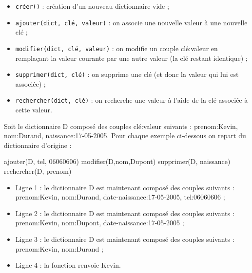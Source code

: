 \documentclass[
  a4paper,
  DIV=11,
  numbers=noendperiod]{scrartcl}
\newenvironment{Shaded}{\begin{snugshade}}{\end{snugshade}}
\newcommand{\DecValTok}[1]{\textcolor[rgb]{0.68,0.00,0.00}{#1}}
\newcommand{\ErrorTok}[1]{\textcolor[rgb]{0.68,0.00,0.00}{#1}}
\newcommand{\NormalTok}[1]{\textcolor[rgb]{0.00,0.23,0.31}{#1}}
\providecommand{\tightlist}{%
  \setlength{\itemsep}{0pt}\setlength{\parskip}{0pt}}\usepackage{longtable,booktabs,array}
\begin{document}
\begin{itemize}
\tightlist
\item
  \texttt{créer()} : création d'un nouveau dictionnaire vide ;
\item
  \texttt{ajouter(dict,\ clé,\ valeur)} : on associe une nouvelle valeur
  à une nouvelle clé ;
\item
  \texttt{modifier(dict,\ clé,\ valeur)} : on modifie un couple
  clé:valeur en remplaçant la valeur courante par une autre valeur (la
  clé restant identique) ;
\item
  \texttt{supprimer(dict,\ clé)} : on supprime une clé (et donc la
  valeur qui lui est associée) ;
\item
  \texttt{rechercher(dict,\ clé)} : on recherche une valeur à l'aide de
  la clé associée à cette valeur.
\end{itemize}

\begin{tcolorbox}[enhanced jigsaw, colback=white, colbacktitle=quarto-callout-caution-color!10!white, bottomtitle=1mm, coltitle=black, opacitybacktitle=0.6, opacityback=0, leftrule=.75mm, breakable, toprule=.15mm, arc=.35mm, titlerule=0mm, toptitle=1mm, title=\textcolor{quarto-callout-caution-color}{\faFire}\hspace{0.5em}{Exemple}, rightrule=.15mm, left=2mm, bottomrule=.15mm]

Soit le dictionnaire D composé des couples clé:valeur suivants :
prenom:Kevin, nom:Durand, naissance:17-05-2005. Pour chaque exemple
ci-dessous on repart du dictionnaire d'origine :

\begin{Shaded}
\begin{Highlighting}[numbers=left,,]
\NormalTok{ajouter(D, tel, }\DecValTok{0}\ErrorTok{6060606}\NormalTok{)}
\NormalTok{modifier(D,nom,Dupont)}
\NormalTok{supprimer(D, naissance)}
\NormalTok{rechercher(D, prenom)}
\end{Highlighting}
\end{Shaded}

\begin{itemize}
\tightlist
\item
  Ligne 1 : le dictionnaire D est maintenant composé des couples
  suivants : prenom:Kevin, nom:Durand, date-naissance:17-05-2005,
  tel:06060606 ;
\item
  Ligne 2 : le dictionnaire D est maintenant composé des couples
  suivants : prenom:Kevin, nom:Dupont, date-naissance:17-05-2005 ;
\item
  Ligne 3 : le dictionnaire D est maintenant composé des couples
  suivants : prenom:Kevin, nom:Durand ;
\item
  Ligne 4 : la fonction renvoie Kevin.
\end{itemize}

\end{tcolorbox}
\end{document}
